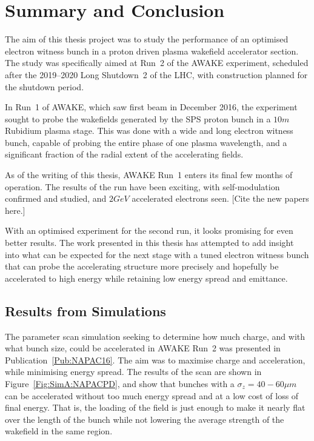 %
%

\chapter{Summary and Conclusion}
\label{Ch:SnC}

The aim of this thesis project was to study the performance of an optimised electron witness bunch in a proton driven plasma wakefield accelerator section.
The study was specifically aimed at Run~2 of the AWAKE experiment, scheduled after the 2019--2020 Long Shutdown~2 of the LHC, with construction planned for the shutdown period.

In Run~1 of AWAKE, which saw first beam in December 2016, the experiment sought to probe the wakefields generated by the SPS proton bunch in a $10\unit{m}$ Rubidium plasma stage.
This was done with a wide and long electron witness bunch, capable of probing the entire phase of one plasma wavelength, and a significant fraction of the radial extent of the accelerating fields.

As of the writing of this thesis, AWAKE Run~1 enters its final few months of operation.
The results of the run have been exciting, with self-modulation confirmed and studied, and $2\unit{GeV}$ accelerated electrons seen.
[Cite the new papers here.]

With an optimised experiment for the second run, it looks promising for even better results.
The work presented in this thesis has attempted to add insight into what can be expected for the next stage with a tuned electron witness bunch that can probe the accelerating structure more precisely and hopefully be accelerated to high energy while retaining low energy spread and emittance.

\section{Results from Simulations}
\label{Sum:Sim}

The parameter scan simulation seeking to determine how much charge, and with what bunch size, could be accelerated in AWAKE Run~2 was presented in Publication~\ref{Pub:NAPAC16}.
The aim was to maximise charge and acceleration, while minimising energy spread.
The results of the scan are shown in Figure~\ref{Fig:SimA:NAPACPD}, and show that bunches with a $\sigma_z = 40-60\unit{\mu m}$ can be accelerated without too much energy spread and at a low cost of loss of final energy.
That is, the loading of the field is just enough to make it nearly flat over the length of the bunch while not lowering the average strength of the wakefield in the same region.

